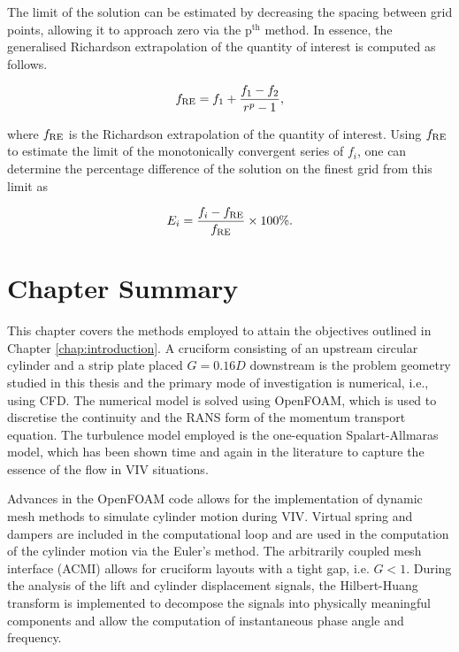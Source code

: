 \documentclass[oneside]{utmthesis}
\begin{document}
The limit of the solution can be estimated by decreasing the spacing between grid points, allowing it to approach zero via the $\text{p}^{\text{th}}$ method. In essence, the generalised Richardson extrapolation of the quantity of interest is computed as follows.

\begin{equation}
  f_{\text{RE}} = f_{1} + \frac{f_{1} - f_{2}}{r^{p} - 1},
  \label{eq:richardsonExtrapolation}
\end{equation}

\noindent where $f_{\text{RE}}$ is the Richardson extrapolation of the quantity of interest. Using $f_{\text{RE}}$ to estimate the limit of the monotonically convergent series of $f_{i}$, one can determine the percentage difference of the solution on the finest grid from this limit as

\begin{equation}
  E_{i} = \frac{f_{i} - f_{\text{RE}}}{f_{\text{RE}}} \times 100\%.
  \label{eq:percentageDifference}
\end{equation}

\section{Chapter Summary} \label{sec:chapSumMethod}
This chapter covers the methods employed to attain the objectives outlined in Chapter \ref{chap:introduction}. A cruciform consisting of an upstream circular cylinder and a strip plate placed $G=0.16D$ downstream is the problem geometry studied in this thesis and the primary mode of investigation is numerical, i.e., using CFD. The numerical model is solved using OpenFOAM, which is used to discretise the continuity and the RANS form of the momentum transport equation. The turbulence model employed is the one-equation Spalart-Allmaras model, which has been shown time and again in the literature to capture the essence of the flow in VIV situations.

Advances in the OpenFOAM code allows for the implementation of dynamic mesh methods to simulate cylinder motion during VIV. Virtual spring and dampers are included in the computational loop and are used in the computation of the cylinder motion via the Euler's method. The arbitrarily coupled mesh interface (ACMI) allows for cruciform layouts with a tight gap, i.e. $G < 1$. During the analysis of the lift and cylinder displacement signals, the Hilbert-Huang transform is implemented to decompose the signals into physically meaningful components and allow the computation of instantaneous phase angle and frequency.
\end{document}
